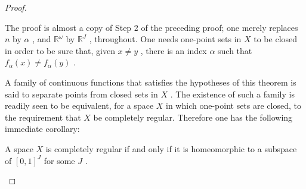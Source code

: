 \begin{proof}
\begin{theorem}
The proof is almost a copy of Step 2 of the preceding proof; one merely replaces \(n\) by \(\alpha\) , and \({\mathbb{R}}^{\omega }\) by \({\mathbb{R}}^{J}\) , throughout. One needs one-point sets in \(X\) to be closed in order to be sure that, given \(x \neq  y\) , there is an index \(\alpha\) such that \({f}_{\alpha }\left( x\right)  \neq  {f}_{\alpha }\left( y\right)\) .

A family of continuous functions that satisfies the hypotheses of this theorem is said to separate points from closed sets in \(X\) . The existence of such a family is readily seen to be equivalent, for a space \(X\) in which one-point sets are closed, to the requirement that \(X\) be completely regular. Therefore one has the following immediate corollary:

\end{theorem}
\begin{theorem}
	A space \(X\) is completely regular if and only if it is homeomorphic to a subspace of \({\left\lbrack  0,1\right\rbrack  }^{J}\) for some \(J\) .

\end{theorem}
\end{proof}

